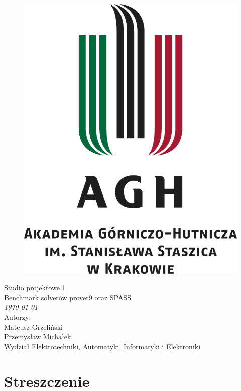 \documentclass[a4paper,12pt]{article}
\begin{document}
\onehalfspacing
\begin{figure}[!htb]
  \centerline{\includegraphics[scale=0.8]{images/agh_logo.jpg}}
\end{figure}

\begin{center}
  \Huge{Studio projektowe 1\\}
  \Large{Benchmark solverów prover9 oraz SPASS\\ \large \textit \today \\}
  \vspace{3cm}
  \Large{	Autorzy:\\
  Mateusz Grzeliński\\
  Przemysław Michałek\\
  }
  \large{Wydział Elektrotechniki, Automatyki, Informatyki i Elektroniki}

  \newpage
\end{center}

\tableofcontents
\newpage

\section{Streszczenie}
\end{document}
